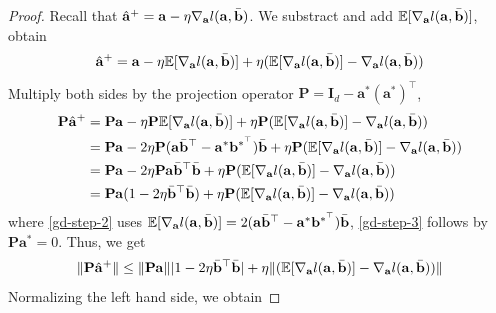 \documentclass{article}
\theoremstyle{plain}
\theoremstyle{definition}
\theoremstyle{remark}
\begin{document}
\begin{proof}

Recall that $\hat{\mathbf{a}}^{+} = \mathbf{a}-\eta   \nabla_{\mathbf{a}}l(\mathbf{a},\Bar{\mathbf{b}})$. We substract and add $\mathbb{E}[\nabla_{\mathbf{a}}l(\mathbf{a},\Bar{\mathbf{b}})]$, obtain
\begin{align}
    \hat{\mathbf{a}}^{+} = \mathbf{a}-\eta\mathbb{E}[\nabla_{\mathbf{a}}l(\mathbf{a},\Bar{\mathbf{b}})] + \eta (\mathbb{E}[\nabla_{\mathbf{a}}l(\mathbf{a},\Bar{\mathbf{b}})]-\nabla_{\mathbf{a}}l(\mathbf{a},\Bar{\mathbf{b}}))
\end{align}
Multiply both sides by the projection operator $\mathbf{P} = \mathbf{I}_d-\mathbf{a}^*(\mathbf{a}^*)^\top$,
\begin{align}
   \mathbf{P} \hat{\mathbf{a}}^{+} &= \mathbf{P}\mathbf{a}-\eta\mathbf{P}\mathbb{E}[\nabla_{\mathbf{a}}l(\mathbf{a},\Bar{\mathbf{b}})] + \eta \mathbf{P}(\mathbb{E}[\nabla_{\mathbf{a}}l(\mathbf{a},\Bar{\mathbf{b}})]-\nabla_{\mathbf{a}}l(\mathbf{a},\Bar{\mathbf{b}})) \\
   & = \mathbf{P}\mathbf{a}- 2\eta\mathbf{P}(\mathbf{a}\Bar{\mathbf{b}}^\top-\mathbf{a}^* \mathbf{b}^{*^\top}) \Bar{\mathbf{b}} + \eta \mathbf{P}(\mathbb{E}[\nabla_{\mathbf{a}}l(\mathbf{a},\Bar{\mathbf{b}})]-\nabla_{\mathbf{a}}l(\mathbf{a},\Bar{\mathbf{b}})) \label{gd-step-2}\\
   & =  \mathbf{P}\mathbf{a}-2\eta\mathbf{P}\mathbf{a}\Bar{\mathbf{b}}^\top \Bar{\mathbf{b}} + \eta \mathbf{P}(\mathbb{E}[\nabla_{\mathbf{a}}l(\mathbf{a},\Bar{\mathbf{b}})]-\nabla_{\mathbf{a}}l(\mathbf{a},\Bar{\mathbf{b}})) \label{gd-step-3} \\
   & = \mathbf{P}\mathbf{a}(1-2\eta \Bar{\mathbf{b}}^\top \Bar{\mathbf{b}})+\eta \mathbf{P}(\mathbb{E}[\nabla_{\mathbf{a}}l(\mathbf{a},\Bar{\mathbf{b}})]-\nabla_{\mathbf{a}}l(\mathbf{a},\Bar{\mathbf{b}})) 
\end{align}
where \eqref{gd-step-2} uses $\mathbb{E}[\nabla_{\mathbf{a}}l(\mathbf{a},\Bar{\mathbf{b}})] = 2(\mathbf{a}\Bar{\mathbf{b}}^\top-\mathbf{a}^* \mathbf{b}^{*^\top}) \Bar{\mathbf{b}} $, \eqref{gd-step-3} follows by $\mathbf{P}\mathbf{a}^*=0$. Thus, we get 
\begin{align}
   \lVert \mathbf{P} \hat{\mathbf{a}}^{+} \rVert \leq  \lVert \mathbf{P}\mathbf{a}\rVert|1-2\eta \Bar{\mathbf{b}}^\top \Bar{\mathbf{b}}|+\eta \lVert (\mathbb{E}[\nabla_{\mathbf{a}}l(\mathbf{a},\Bar{\mathbf{b}})]-\nabla_{\mathbf{a}}l(\mathbf{a},\Bar{\mathbf{b}})) \rVert
\end{align}
Normalizing the left hand side, we obtain

\end{proof}
\end{document}
